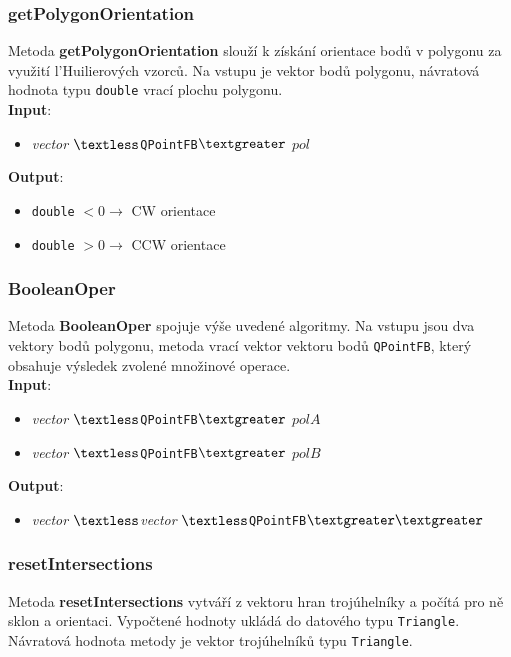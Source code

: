 \documentclass[a4paper, 12pt]{article}
\begin{document}
\subsubsection*{getPolygonOrientation}
Metoda \textbf{getPolygonOrientation} slouží k získání orientace bodů v polygonu za využití l'Huilierových vzorců. Na vstupu je vektor bodů polygonu, návratová hodnota typu \texttt{double} vrací plochu polygonu.\\

\textbf{Input}:
\begin{itemize}
\item \textsl{vector} $\textless$\texttt{QPointFB}$\textgreater$ $pol$
\end{itemize}

\textbf{Output}:
\begin{itemize}
\item \texttt{double} $< 0 \rightarrow$ CW orientace
\item \texttt{double} $> 0 \rightarrow$ CCW orientace
\end{itemize}

\subsubsection*{BooleanOper}
Metoda \textbf{BooleanOper} spojuje výše uvedené algoritmy. Na vstupu jsou dva vektory bodů polygonu, metoda vrací vektor vektoru bodů \texttt{QPointFB}, který obsahuje výsledek zvolené množinové operace.\\

\textbf{Input}:
\begin{itemize}
\item \textsl{vector} $\textless$\texttt{QPointFB}$\textgreater$ $polA$
\item \textsl{vector} $\textless$\texttt{QPointFB}$\textgreater$ $polB$
\end{itemize}

\textbf{Output}:
\begin{itemize}
\item \textsl{vector} $\textless$\textsl{vector} $\textless$\texttt{QPointFB}$\textgreater \textgreater$
\end{itemize}

\subsubsection*{resetIntersections}
Metoda \textbf{resetIntersections} vytváří z vektoru hran trojúhelníky a počítá pro ně sklon a orientaci. Vypočtené hodnoty ukládá do datového typu \texttt{Triangle}. Návratová hodnota metody je vektor trojúhelníků typu \texttt{Triangle}.\\
\end{document}
